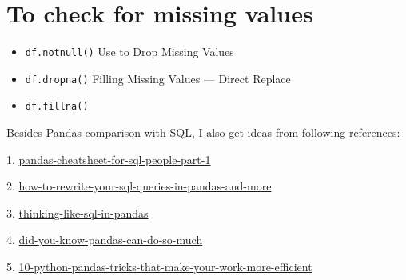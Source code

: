 \documentclass[11pt]{article}
\begin{document}
\section{To check for missing values }
\begin{itemize}
\item \texttt{df.notnull()} Use to Drop Missing Values 
\item \texttt{df.dropna()} Filling Missing Values --- Direct Replace
\item \texttt{df.fillna()} 
\end{itemize}
Besides \href{https://pandas.pydata.org/pandas-docs/stable/getting_started/comparison/comparison_with_sql.html}{Pandas comparison with SQL},
I also get ideas from following references: 

1. \href{https://hackernoon.com/pandas-cheatsheet-for-sql-people-part-1-2976894acd0}{pandas-cheatsheet-for-sql-people-part-1}

2. \href{https://medium.com/jbennetcodes/how-to-rewrite-your-sql-queries-in-pandas-and-more-149d341fc53e}{how-to-rewrite-your-sql-queries-in-pandas-and-more}

3. \href{https://www.kaggle.com/anagharumade/thinking-like-sql-in-pandas}{thinking-like-sql-in-pandas}

4. \href{https://medium.com/fintechexplained/did-you-know-pandas-can-do-so-much-f65dc7db3051}{did-you-know-pandas-can-do-so-much}

5. \href{https://towardsdatascience.com/10-python-pandas-tricks-that-make-your-work-more-efficient-2e8e483808ba}{10-python-pandas-tricks-that-make-your-work-more-efficient}

\end{document}
